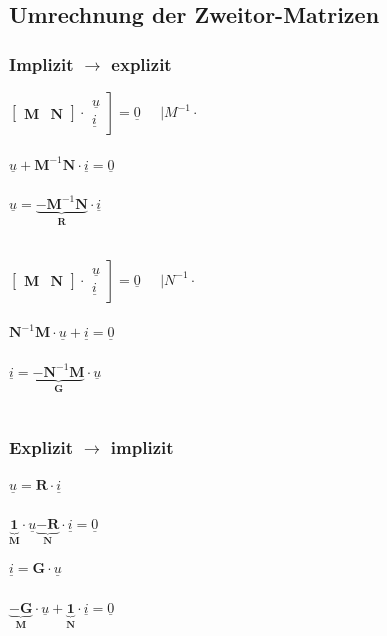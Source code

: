 \documentclass[a4paper,twocolumn,10pt]{article}
\begin{document}
\subsection*{Umrechnung der Zweitor-Matrizen}
\subsubsection*{Implizit $\rightarrow$ explizit}
\begin{minipage}[b]{0.23\textwidth}
$\begin{bmatrix}\textbf{M} & \textbf{N}\end{bmatrix}\cdot \left.\begin{matrix}\underline{u}\\\underline{i}\end{matrix}\right]=\underline{0}\;\;\;\;\;|M^{-1}\cdot$\\\\
$\underline{u}+\textbf{M}^{-1}\textbf{N}\cdot \underline{i}=\underline{0}$\\\\
$\underline{u}=\underbrace{-\textbf{M}^{-1}\textbf{N}}_{\textbf{R}}\cdot \underline{i}$\\\\
\end{minipage}
\hfill
\begin{minipage}[b]{0.23\textwidth}
$\begin{bmatrix}\textbf{M} & \textbf{N}\end{bmatrix}\cdot \left.\begin{matrix}\underline{u}\\\underline{i}\end{matrix}\right]=\underline{0}\;\;\;\;\;|N^{-1}\cdot$\\\\
$\textbf{N}^{-1}\textbf{M}\cdot\underline{u}+ \underline{i}=\underline{0}$\\\\
$\underline{i}=\underbrace{-\textbf{N}^{-1}\textbf{M}}_{\textbf{G}}\cdot \underline{u}$\\\\
\end{minipage}

\subsubsection*{Explizit $\rightarrow$ implizit}
\begin{minipage}[b]{0.23\textwidth}
$\underline{u}=\textbf{R}\cdot \underline{i}$\\\\
$\underbrace{\textbf{1}}_{\textbf{M}}\cdot \underline{u}\underbrace{-\textbf{R}}_{\textbf{N}}\cdot \underline{i}=\underline{0}$
\end{minipage}
\hfill
\begin{minipage}[b]{0.23\textwidth}
$\underline{i}=\textbf{G}\cdot \underline{u}$\\\\
$\underbrace{-\textbf{G}}_{\textbf{M}}\cdot \underline{u}+\underbrace{\textbf{1}}_{\textbf{N}}\cdot \underline{i}=\underline{0}$
\end{minipage}
\end{document}
